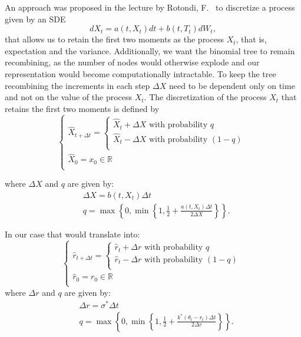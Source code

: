\documentclass[titlepage, 12pt]{article}
\begin{document}
	An approach was proposed in the lecture by Rotondi, F.~\cite{rotondi2024lecture} to discretize a process given by an SDE
	\begin{equation}
		dX_t = a(t,X_t)dt + b(t,T_t)dW_t,
	\end{equation}
	that allows us to retain the first two moments as the process $X_t$, that is, expectation and the variance. Additionally, we want the binomial tree to remain recombining, as the number of nodes would otherwise explode and our representation would become computationally intractable. To keep the tree recombining the increments in each step $\Delta X$ need to be dependent only on time and not on the value of the process $X_t$. The discretization of the process $X_t$ that retains the first two moments is defined by
	\begin{equation}
		\left\{
		\begin{array}{l}
			\hat{X}_{t+\Delta t } = \left\{
			\begin{array}{l}
				\hat{X}_t + \Delta X \text{ with probability } q\\
				\hat{X}_t - \Delta X \text{ with probability } (1-q)\\
			\end{array}
			\right. \\
			\hat{X}_0 = x_0 \in \mathbb{R}\\
		\end{array}
		\right.
	\end{equation}
	
	where $\Delta X$ and $q$ are given by:
	\begin{equation}
		\begin{split}
			&\Delta X = b(t,X_t)\Delta t \\
			&q = \max\left\{ 0, \min \left\{ 1, \frac{1}{2}+\frac{a(t,X_t)\Delta t}{2\Delta X} \right\} \right\}.
		\end{split}
	\end{equation}
	
	In our case that would translate into:
	\begin{equation}\label{eq:lattice}
		\left\{
		\begin{array}{l}
			\hat{r}_{t+\Delta t } = \left\{
			\begin{array}{l}
				\hat{r}_t + \Delta r \text{ with probability } q\\
				\hat{r}_t - \Delta r \text{ with probability } (1-q)\\
			\end{array}
			\right. \\
			\hat{r}_0 = r_0 \in \mathbb{R}\\
		\end{array}
		\right.
	\end{equation}
	where $\Delta r$ and $q$ are given by:
	\begin{equation}
		\begin{split}
			&\Delta r = \sigma^*\Delta t \\
			&q = \max\left\{ 0, \min \left\{ 1, \frac{1}{2}+\frac{k^*(\theta_t - r_t) \Delta t}{2\Delta r} \right\} \right\}.
		\end{split}
	\end{equation}
	
\end{document}
